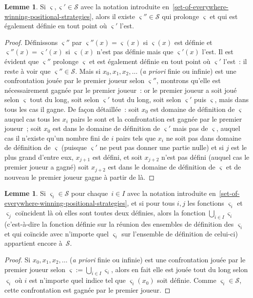 \documentclass[12pt,a4paper]{article}
\theoremstyle{definition}
\newtheorem{lem}[comcnt]{Lemme}
\begin{document}
\begin{lem}\label{positional-strategies-merging-lemma}
Si $\varsigma,\varsigma' \in \mathcal{S}$ avec la notation introduite
en \ref{set-of-everywhere-winning-positional-strategies}, alors il
existe $\varsigma'' \in \mathcal{S}$ qui prolonge $\varsigma$ et qui
est également définie en tout point où $\varsigma'$ l'est.
\end{lem}
\begin{proof}
Définissons $\varsigma''$ par $\varsigma''(x) = \varsigma(x)$ si
$\varsigma(x)$ est définie et $\varsigma''(x) = \varsigma'(x)$ si
$\varsigma(x)$ n'est pas définie mais que $\varsigma'(x)$ l'est.  Il
est évident que $\varsigma''$ prolonge $\varsigma$ et est également
définie en tout point où $\varsigma'$ l'est : il reste à voir que
$\varsigma'' \in \mathcal{S}$.  Mais si $x_0,x_1,x_2,\ldots$
(\textit{a priori} finie ou infinie) est une confrontation jouée par
le premier joueur selon $\varsigma''$, montrons qu'elle est
nécessairement gagnée par le premier joueur : or le premier joueur a
soit joué selon $\varsigma$ tout du long, soit selon $\varsigma'$ tout
du long, soit selon $\varsigma'$ puis $\varsigma$, mais dans tous les
cas il gagne.  De façon détaillée : soit $x_0$ est domaine de
définition de $\varsigma$ auquel cas tous les $x_i$ pairs le sont et
la confrontation est gagnée par le premier joueur ; soit $x_0$ est
dans le domaine de définition de $\varsigma'$ mais pas de $\varsigma$,
auquel cas il n'existe qu'un nombre fini de $i$ pairs tels que $x_i$
ne soit pas dans domaine de définition de $\varsigma$ (puisque
$\varsigma'$ ne peut pas donner une partie nulle) et si $j$ est le
plus grand d'entre eux, $x_{j+1}$ est défini, et soit $x_{j+2}$ n'est
pas défini (auquel cas le premier joueur a gagné) soit $x_{j+2}$ est
dans le domaine de définition de $\varsigma$ et de nouveau le premier
joueur gagne à partir de là.
\end{proof}

\begin{lem}\label{positional-strategies-union-lemma}
Si $\varsigma_i \in \mathcal{S}$ pour chaque $i\in I$ avec la notation
introduite en \ref{set-of-everywhere-winning-positional-strategies},
et si pour tous $i,j$ les fonctions $\varsigma_i$ et $\varsigma_j$
coïncident là où elles sont toutes deux définies, alors la fonction
$\bigcup_{i\in I} \varsigma_i$ (c'est-à-dire la fonction définie sur
la réunion des ensembles de définition des $\varsigma_i$ et qui
coïncide avec n'importe quel $\varsigma_i$ sur l'ensemble de
définition de celui-ci) appartient encore à $\mathcal{S}$.
\end{lem}
\begin{proof}
Si $x_0,x_1,x_2,\ldots$ (\textit{a priori} finie ou infinie) est une
confrontation jouée par le premier joueur selon $\varsigma :=
\bigcup_{i\in I} \varsigma_i$, alors en fait elle est jouée tout du
long selon $\varsigma_i$ où $i$ est n'importe quel indice tel que
$\varsigma_i(x_0)$ soit définie.  Comme $\varsigma_i \in \mathcal{S}$,
cette confrontation est gagnée par le premier joueur.
\end{proof}
\end{document}

